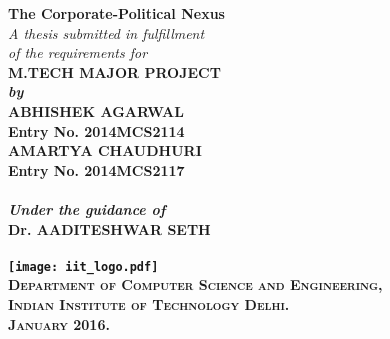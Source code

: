 \begin{titlepage}
\begin{center}

\LARGE{\textsf{\bfseries The Corporate-Political Nexus}}\\
\vspace{20pt}
\normalsize
\emph{A thesis submitted in fulfillment} \\
\emph{of the requirements for} \\
\vspace{20pt}
\bfseries M.TECH MAJOR PROJECT \\
\emph {by}\\
\vspace{20pt}
\Large{\textsf{\bfseries ABHISHEK AGARWAL}} \\
{\normalsize \textsf{\bfseries Entry No. 2014MCS2114}}\\
\vspace{10pt}
\Large{\textsf{\bfseries AMARTYA CHAUDHURI}} \\
{\normalsize \textsf{\bfseries Entry No. 2014MCS2117}}\\
\ \\
{\normalsize \emph {Under the guidance of}}
\ \\
\Large{\textsf{\bfseries Dr. AADITESHWAR SETH}} \\
\ \\
\vspace{30pt}
\texttt{[image: iit\_logo.pdf]} \\
\vspace{10pt}
\large{\textsc{Department of Computer Science and Engineering,\\
Indian Institute of Technology Delhi.\\ January 2016.}}
\end{center}
\end{titlepage}

